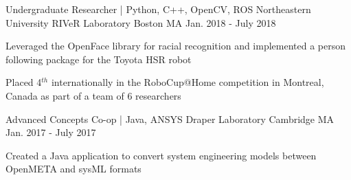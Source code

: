 \begin{cventries}
  \cventry
    {Undergraduate Researcher | Python, C++, OpenCV, ROS} %
    {Northeastern University RIVeR Laboratory} %
    {Boston MA} %
    {Jan. 2018 - July 2018} %
    {
      \begin{cvitems} %
        \item {Leveraged the OpenFace library for racial recognition and implemented a person following package for the Toyota HSR robot}
        \item {Placed 4$^{th}$ internationally in the RoboCup@Home competition in Montreal, Canada as part of a team of 6 researchers}
      \end{cvitems}
    }

  \cventry
    {Advanced Concepts Co-op | Java, ANSYS} %
    {Draper Laboratory} %
    {Cambridge MA} %
    {Jan. 2017 - July 2017} %
    {
      \begin{cvitems} %
        \item {Created a Java application to convert system engineering models between OpenMETA and sysML formats}
      \end{cvitems}
    }

\end{cventries}
